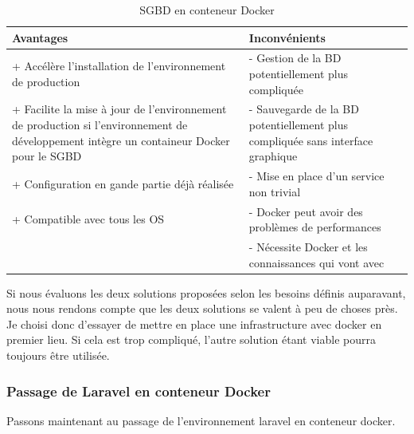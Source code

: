 \documentclass[
    iai, %
    il, %
]{heig-tb}
\begin{document}
\begin{table}[h]
    \begin{center}
        \caption{SGBD en conteneur Docker \label{prod-db-docker}}
        \begin{tabularx}{1.0\textwidth} {X|X}
            Avantages                                                  & Inconvénients                                                          \\ \hline
            + Accélère l'installation de l'environnement de production & - Gestion de la BD
            potentiellement plus compliquée                                                                                                     \\
            + Facilite la mise à jour de l'environnement de production si l'environnement de
            développement intègre un containeur Docker pour le SGBD    & - Sauvegarde de la BD
            potentiellement plus compliquée sans interface graphique                                                                            \\
            + Configuration en gande partie déjà réalisée              & - Mise en place d'un service non trivial                               \\
            + Compatible avec tous les OS                              & - Docker peut avoir des problèmes de performances
            \cite{labrecque}                                                                                                                    \\
                                                                       & - Nécessite Docker et les connaissances qui vont avec \cite{labrecque} \\
        \end{tabularx}
    \end{center}
\end{table}

Si nous évaluons les deux solutions proposées selon les besoins définis auparavant, nous nous rendons compte que les deux solutions se valent à peu de choses près. Je choisi donc d'essayer de mettre en place une infrastructure avec \Gls{docker} en premier lieu. Si cela est trop compliqué, l'autre solution étant viable pourra toujours être utilisée.

\subsubsection{Passage de Laravel en conteneur Docker}
Passons maintenant au passage de l'environnement \Gls{laravel} en \Gls{conteneur} \Gls{docker}.
\end{document}
